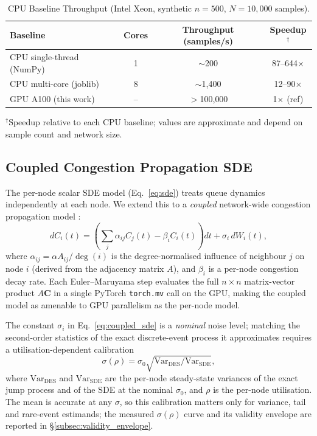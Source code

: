 \documentclass{ieeeaccess}
\begin{document}
\begin{table}[!t]
\caption{CPU Baseline Throughput (Intel Xeon, synthetic $n{=}500$, $N{=}10{,}000$ samples).}
\label{tab:cpu_baselines}
\centering\footnotesize
\setlength{\tabcolsep}{3.5pt}
\begin{tabular}{@{}l c c c@{}}
\toprule
Baseline & Cores & Throughput (samples/s) & Speedup$^\dagger$ \\
\midrule
CPU single-thread (NumPy) & 1 & $\sim$200 & 87--644$\times$ \\
CPU multi-core (joblib) & 8 & $\sim$1{,}400 & 12--90$\times$ \\
GPU A100 (this work) & -- & $>$100{,}000 & 1$\times$ (ref) \\
\bottomrule
\end{tabular}
\vspace{2pt}
\parbox{\columnwidth}{\footnotesize $^\dagger$Speedup relative to each CPU baseline;
values are approximate and depend on sample count and network size.}
\end{table}

\subsection{Coupled Congestion Propagation SDE}
\label{subsec:spatial}

The per-node scalar SDE model (Eq.~\eqref{eq:sde}) treats queue dynamics independently at each
node. We extend this to a \emph{coupled} network-wide congestion propagation model
\cite{kang2007,harrison1985,reiman1984open}:
\begin{equation}
    dC_i(t) = \left(\sum_j \alpha_{ij} C_j(t) - \beta_i C_i(t)\right)dt
              + \sigma_i\, dW_i(t),
    \label{eq:coupled_sde}
\end{equation}
where $\alpha_{ij} = \alpha A_{ij} / \deg(i)$ is the degree-normalised influence of neighbour
$j$ on node $i$ (derived from the adjacency matrix $A$), and $\beta_i$ is a per-node congestion
decay rate. Each Euler--Maruyama step evaluates the full $n \times n$ matrix-vector product
$A\mathbf{C}$ in a single PyTorch \texttt{torch.mv} call on the GPU, making the coupled model as
amenable to GPU parallelism as the per-node model.

The constant $\sigma_i$ in Eq.~\eqref{eq:coupled_sde} is a \emph{nominal} noise level; matching
the second-order statistics of the exact discrete-event process it approximates requires a
utilisation-dependent calibration
\begin{equation}
\sigma(\rho)=\sigma_0\sqrt{\mathrm{Var}_{\mathrm{DES}}/\mathrm{Var}_{\mathrm{SDE}}},
\label{eq:sigma_calib}
\end{equation}
where $\mathrm{Var}_{\mathrm{DES}}$ and $\mathrm{Var}_{\mathrm{SDE}}$ are the per-node steady-state
variances of the exact jump process and of the SDE at the nominal $\sigma_0$, and $\rho$ is the
per-node utilisation. The mean is accurate at any $\sigma$, so this calibration matters only for
variance, tail and rare-event estimands; the measured $\sigma(\rho)$ curve and its validity
envelope are reported in \S\ref{subsec:validity_envelope}.
\end{document}
